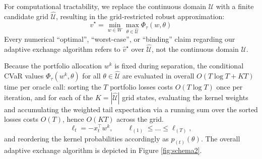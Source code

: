 \documentclass[smallextended]{svjour3}
\begin{document}
For computational tractability, we replace the continuous domain $\mathcal{U}$ with a finite candidate grid $\widehat{\mathcal{U}}$, resulting in the grid-restricted robust approximation:
\begin{equation}
    \widehat{v}^\star = \min_{w \in W} \max_{\theta \in \widehat{\mathcal{U}}} \Phi_\tau(w, \theta)
\end{equation}
Every numerical ``optimal'', ``worst-case'', or ``binding'' claim regarding our adaptive exchange algorithm refers to $\widehat{v}^\star$ over $\widehat{\mathcal{U}}$, not the continuous domain $\mathcal{U}$.


Because the portfolio allocation $w^k$ is fixed during separation, the conditional CVaR values $\Phi_\tau(w^k,\theta)$ for all $\theta\in\widehat{\mathcal{U}}$ are evaluated in overall $O(T\log T + KT)$ time per oracle call: sorting the $T$ portfolio losses costs $O(T\log T)$ once per iteration, and for each of the $K = |\widehat{\mathcal{U}}|$ grid states, evaluating the kernel weights and accumulating the weighted tail expectation via a running sum over the sorted losses costs $O(T)$, hence $O(KT)$ across the grid.
\begin{equation}
\ell_t = -x_t^\top w^k,\qquad \ell_{(1)} \le \dots \le \ell_{(T)},
\end{equation}
and reordering the kernel probabilities accordingly as $p_{(t)}(\theta)$.
The overall adaptive exchange algorithm is depicted in Figure \ref{fig:schema2}.
\end{document}
